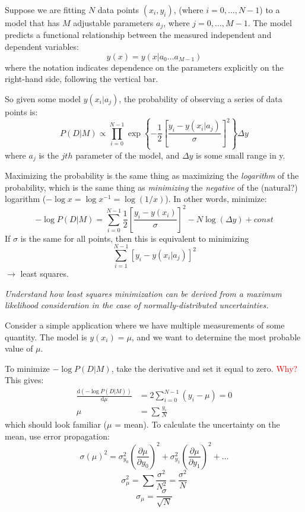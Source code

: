 \documentclass{article}
\newcommand{\test}[1]{%
    \begin{center}
        \colorbox{hl}{\parbox{0.9\textwidth}{\emph{\centering #1}}}
    \end{center}}
\newcommand{\mynotes}[1]{%
    \fontfamily{phv}\selectfont\textcolor{myGreen}{#1}
    }
\begin{document}
\mynotes{
    Suppose we are fitting $N$ data points $(x_{i},y_{i})$,
    (where $i=0,\ldots,N-1$) to a model
    that has $M$ adjustable parameters $a_{j}$, where $j=0,\ldots,M-1$.
    The model predicts a functional relationship between the measured
    independent and dependent variables:
    \[
        y(x) = y(x|a_{0} \ldots a_{M-1})
        \]
    where the notation indicates dependence on the parameters explicitly on the
    right-hand side, following the vertical bar.
}

So given some model $y(x_{i}|a_{j})$, the probability of observing a
series of data points is:
\[
    P(D|M) \propto \prod_{i=0}^{N-1}{
        \exp  \left\{ -\frac{1}{2} \left[ \frac{y_{i} - y(x_{i}|a_{j})}{\sigma}
        \right] ^{2} \right\}}
    \Delta{y}
    \]
where $a_{j}$ is the $jth$ parameter of the model, and $\Delta y$ is some small
range in y.

Maximizing the probability is the same thing as
maximizing the \emph{logarithm} of the probability, which is the same thing as
\emph{minimizing} the \emph{negative} of the (natural?) logarithm
($-\log{x} = \log{x^{-1}} = \log(1/x)$).
In other words, minimize:
\[
    -\log P(D|M) = \sum^{N-1}_{i=0}{
        \frac{1}{2} \left[ \frac{y_{i} - y(x_{i})}{\sigma}
        \right]^2
    }
    - N\log \left( \Delta{y} \right) + const
    \]
If $\sigma$ is the same for all points, then this is equivalent to minimizing
\[
    \sum_{i=1}^{N-1}{
        \left[ y_{i} - y \left( x_{i}|a_{j} \right) \right]^{2} }
   \]
$\rightarrow$ least squares.

\test{Understand how least squares minimization can be derived from a maximum
    likelihood consideration in the case of normally-distributed
    uncertainties.}

Consider a simple application where we have multiple measurements of some
quantity. The model is $y(x_{i}) = \mu$, and we want to determine the
most probable value of $\mu$.

To minimize $-\log{P(D|M)}$, take the derivative and set it equal to zero.
\textcolor{red}{Why?}
This gives:
\begin{align*}
    \frac{\mathrm{d}(-\log P(D|M))}{\mathrm{d}\mu}
    &= 2\sum^{N-1}_{i=0}(y_{i}-\mu) = 0 \\[1ex]
    \mu &= \sum \frac{y_{i}}{N}
\end{align*}
which should look familiar ($\mu$ = mean).
To calculate the uncertainty on the mean, use error propagation:
\[
    \sigma(\mu)^2 = \sigma_{y_{0}}^2
    \left( \frac{\partial{\mu}}{\partial{y}_{0}}\right)^2
    + \sigma_{y_{1}}^2
    \left( \frac{\partial{\mu}}{\partial{y}_{1}}\right)^2
    + \ldots
    \]
\[
    \sigma_{\mu}^{2}
    = \sum{ \frac{\sigma^{2}}{N^{2}}
    = \frac{\sigma^{2}}{N}}
    \]
\[
    \sigma_{\mu} = \frac{\sigma}{\sqrt{N}}
    \]
\end{document}
